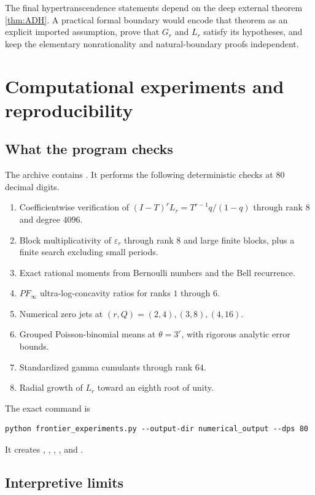 \documentclass[11pt,oneside]{article}
\theoremstyle{definition}
\theoremstyle{remark}
\begin{document}
The final hypertranscendence statements depend on the deep external theorem
\ref{thm:ADH}.  A practical formal boundary would encode that theorem as an
explicit imported assumption, prove that $G_r$ and $L_r$ satisfy its
hypotheses, and keep the elementary nonrationality and natural-boundary proofs
independent.

\section{Computational experiments and reproducibility}

\subsection{What the program checks}

The archive contains .  It performs the
following deterministic checks at 80 decimal digits.

\begin{enumerate}
\item Coefficientwise verification of
$(I-T)^rL_r=T^{r-1}q/(1-q)$ through rank $8$ and degree $4096$.
\item Block multiplicativity of $\varepsilon_r$ through rank $8$ and large
finite blocks, plus a finite search excluding small periods.
\item Exact rational moments from Bernoulli numbers and the Bell recurrence.
\item $PF_\infty$ ultra-log-concavity ratios for ranks $1$ through $6$.
\item Numerical zero jets at $(r,Q)=(2,4),(3,8),(4,16)$.
\item Grouped Poisson-binomial means at $\theta=3^r$, with rigorous analytic
error bounds.
\item Standardized gamma cumulants through rank $64$.
\item Radial growth of $L_r$ toward an eighth root of unity.
\end{enumerate}

The exact command is
\begin{lstlisting}[style=code]
python frontier_experiments.py --output-dir numerical_output --dps 80
\end{lstlisting}
It creates
, ,
, , and
.

\subsection{Interpretive limits}
\end{document}
